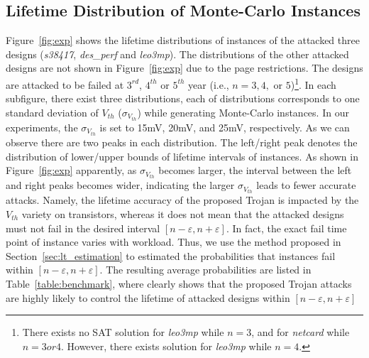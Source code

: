 \subsection{Lifetime Distribution of Monte-Carlo Instances}
\label{sec:exp:exp}
Figure~\ref{fig:exp} shows the lifetime distributions of instances of the attacked three designs (\textit{s38417}, \textit{des\_perf} and \textit{leo3mp}). The distributions of the other attacked designs are not shown in Figure~\ref{fig:exp} due to the page restrictions. The designs are attacked to be failed at $3^{rd}$, $4^{th}$ or $5^{th}$ year (i.e., $n = 3, 4,$ or $5$)\footnote{There exists no SAT solution for \textit{leo3mp} while $n = 3$, and for \textit{netcard} while $n = 3 or 4$. However, there exists solution for \textit{leo3mp} while $n = 4$.}. In each subfigure, there exist three distributions, each of distributions corresponds to one standard deviation of $V_{th}$ ($\sigma_{V_{th}}$) while generating Monte-Carlo instances. In our experiments, the $\sigma_{V_{th}}$ is set to 15mV, 20mV, and 25mV, respectively. As we can observe there are two peaks in each distribution. The left/right peak denotes the distribution of lower/upper bounds of lifetime intervals of instances. %
As shown in Figure~\ref{fig:exp} apparently, as $\sigma_{V_{th}}$ becomes larger, the interval between the left and right peaks becomes wider, indicating the larger $\sigma_{V_{th}}$ leads to fewer accurate attacks. Namely, the lifetime accuracy of the proposed Trojan is impacted by the $V_{th}$ variety on transistors, whereas it does not mean that the attacked designs must not fail in the desired interval $[n-\varepsilon,n+\varepsilon]$. In fact, the exact fail time point of instance varies with workload.  Thus, we use the method proposed in Section~\ref{sec:lt_estimation} to estimated the probabilities that instances fail within $[n-\varepsilon,n+\varepsilon]$. The resulting average probabilities are listed in Table~\ref{table:benchmark}, where clearly shows that the proposed Trojan attacks are highly likely to control the lifetime of attacked designs within $[n-\varepsilon,n+\varepsilon]$%

